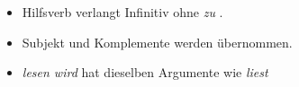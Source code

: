 {\begin{itemize}
\item Hilfsverb verlangt Infinitiv ohne \emph{zu} .
\pause
\item Subjekt  und Komplemente  werden übernommen.
\pause
\item \emph{lesen wird} hat dieselben Argumente wie \emph{liest}
\end{itemize}



}

